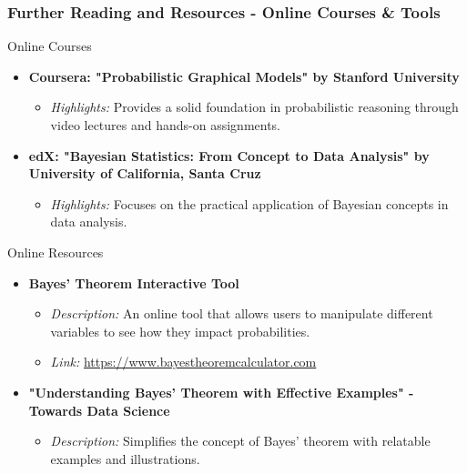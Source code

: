 \documentclass[aspectratio=169]{beamer}
\begin{document}
\begin{frame}[fragile]
    \frametitle{Further Reading and Resources - Online Courses & Tools}
    \begin{block}{Online Courses}
        \begin{itemize}
            \item \textbf{Coursera: "Probabilistic Graphical Models" by Stanford University}
            \begin{itemize}
                \item \textit{Highlights:} Provides a solid foundation in probabilistic reasoning through video lectures and hands-on assignments.
            \end{itemize}
            \item \textbf{edX: "Bayesian Statistics: From Concept to Data Analysis" by University of California, Santa Cruz}
            \begin{itemize}
                \item \textit{Highlights:} Focuses on the practical application of Bayesian concepts in data analysis.
            \end{itemize}
        \end{itemize}
    \end{block}

    \begin{block}{Online Resources}
        \begin{itemize}
            \item \textbf{Bayes’ Theorem Interactive Tool}
            \begin{itemize}
                \item \textit{Description:} An online tool that allows users to manipulate different variables to see how they impact probabilities.
                \item \textit{Link:} \url{https://www.bayestheoremcalculator.com}
            \end{itemize}
            \item \textbf{"Understanding Bayes' Theorem with Effective Examples" - Towards Data Science}
            \begin{itemize}
                \item \textit{Description:} Simplifies the concept of Bayes' theorem with relatable examples and illustrations.
            \end{itemize}
        \end{itemize}
    \end{block}
\end{frame}
\end{document}
